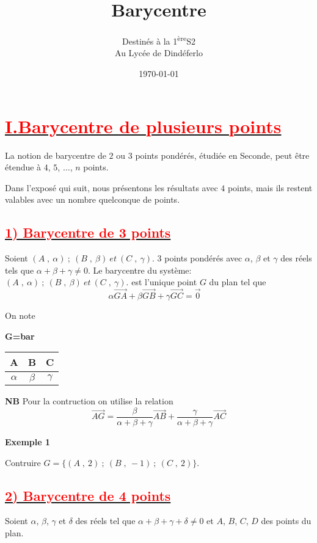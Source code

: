\documentclass{article}
\author{Destinés à la 1\textsuperscript{ère}S2\\Au Lycée de Dindéferlo}
\title{\textbf{Barycentre}}
\date{\today}
\begin{document}
\maketitle
\newpage

\section*{\underline{\textbf{\textcolor{red}{I.Barycentre de plusieurs points}}}}
	La notion de barycentre de $2$ ou $3$ points pondérés, étudiée en Seconde, peut être étendue à $4$, $5$, $\ldots$, $n$ points. 
	
	Dans l'exposé qui suit, nous présentons les résultats avec $4$ points, mais ils restent valables avec un nombre quelconque de points.
	\subsection*{\underline{\textbf{\textcolor{red}{1) Barycentre de 3 points }}}}
	Soient $(A\;,\ \alpha)\ ;\ (B\;,\ \beta)\ et \ (C\;,\ \gamma).$ 3 points pondérés avec $\alpha$, $\beta$ et $\gamma$ des réels tels que $\alpha+\beta+\gamma\neq 0$. Le barycentre du système: $(A\;,\ \alpha)\ ;\ (B\;,\ \beta)\ et \ (C\;,\ \gamma).$ est l'unique point $G$ du plan tel que $$\alpha\overrightarrow{GA}+\beta\overrightarrow{GB}+\gamma\overrightarrow{GC}=\overrightarrow{0}\quad$$

On note
\begin{table}[h!]
\textbf{G=bar}
\begin{tabular}{|c|c|c|}
\textbf{A} & \textbf{B} & \textbf{C} \\ \hline
$\alpha$        & $\beta$           & $\gamma$          \\
\end{tabular}
\end{table}

\textbf{NB} Pour la contruction on utilise la relation $$\overrightarrow{AG}=\dfrac{\beta}{\alpha+\beta+\gamma}\overrightarrow{AB}+\dfrac{\gamma}{\alpha+\beta+\gamma}\overrightarrow{AC}$$

\textbf{Exemple 1}

Contruire $G=\{(A\;,\ 2)\ ;\ (B\;,\ -1)\ ;\ (C\;,\ 2) \}.$

	\subsection*{\underline{\textbf{\textcolor{red}{2) Barycentre de 4 points }}}}
	
	Soient $\alpha$, $\beta$, $\gamma$ et $\delta$ des réels tel que $\alpha+\beta+\gamma+\delta\neq 0$ et $A$, $B$, $C$, $D$ des points du plan. 
	
\end{document}

